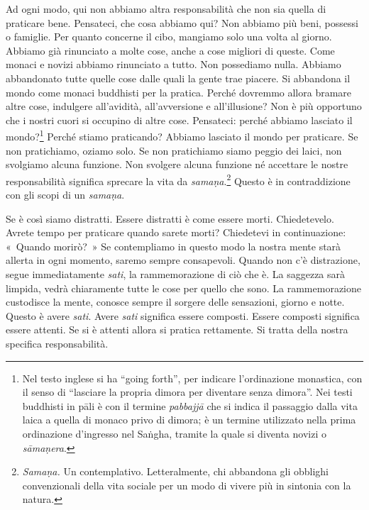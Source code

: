 Ad ogni modo, qui non abbiamo altra responsabilità che non sia quella di
praticare bene. Pensateci, che cosa abbiamo qui? Non abbiamo più beni,
possessi o famiglie. Per quanto concerne il cibo, mangiamo solo una
volta al giorno. Abbiamo già rinunciato a molte cose, anche a cose
migliori di queste. Come monaci e novizi abbiamo rinunciato a tutto. Non
possediamo nulla. Abbiamo abbandonato tutte quelle cose dalle quali la
gente trae piacere. Si abbandona il mondo come monaci buddhisti per la
pratica. Perché dovremmo allora bramare altre cose, indulgere
all'avidità, all'avversione e all'illusione? Non è più opportuno che i
nostri cuori si occupino di altre cose. Pensateci: perché abbiamo
lasciato il mondo?\footnote{%
  Nel testo inglese si ha ``going forth'', per indicare l'ordinazione
  monastica, con il senso di ``lasciare la propria dimora per diventare
  senza dimora''. Nei testi buddhisti in pāli è con il termine
  \emph{pabbajjā} che si indica il passaggio dalla vita laica a quella di
  monaco privo di dimora; è un termine utilizzato nella prima
  ordinazione d'ingresso nel Saṅgha, tramite la quale si diventa novizi
  o \emph{sāmaṇera}.}
Perché stiamo praticando? Abbiamo lasciato il mondo per
praticare. Se non pratichiamo, oziamo solo. Se non pratichiamo siamo
peggio dei laici, non svolgiamo alcuna funzione. Non svolgere alcuna
funzione né accettare le nostre responsabilità significa sprecare la
vita da \emph{samaṇa}.\footnote{\emph{Samaṇa.} Un contemplativo.
  Letteralmente, chi abbandona gli obblighi convenzionali della vita
  sociale per un modo di vivere più in sintonia con la natura.} Questo è
in contraddizione con gli scopi di un \emph{samaṇa}.

Se è così siamo distratti. Essere distratti è come essere morti.
Chiedetevelo. Avrete tempo per praticare quando sarete morti? Chiedetevi
in continuazione: «~Quando morirò?~» Se contempliamo in questo modo la
nostra mente starà allerta in ogni momento, saremo sempre consapevoli.
Quando non c'è distrazione, segue immediatamente \emph{sati}, la
rammemorazione di ciò che è. La saggezza sarà limpida, vedrà chiaramente
tutte le cose per quello che sono. La rammemorazione custodisce la
mente, conosce sempre il sorgere delle sensazioni, giorno e notte.
Questo è avere \emph{sati}. Avere \emph{sati} significa essere composti.
Essere composti significa essere attenti. Se si è attenti allora si
pratica rettamente. Si tratta della nostra specifica responsabilità.


